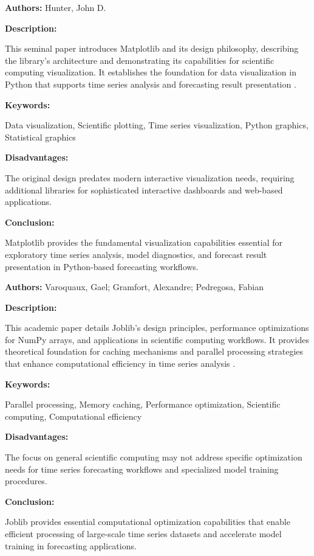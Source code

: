 
{ 
	
	\textbf{Authors:} Hunter, John D.
	
	\textbf{Description:} 
	
	This seminal paper introduces Matplotlib and its design philosophy, describing the library's architecture and demonstrating its capabilities for scientific computing visualization. It establishes the foundation for data visualization in Python that supports time series analysis and forecasting result presentation \autocite{Hunter:2007}.
	
	\textbf{Keywords:} 
	
	Data visualization, Scientific plotting, Time series visualization, Python graphics, Statistical graphics
	
	\textbf{Disadvantages:} 
	
	The original design predates modern interactive visualization needs, requiring additional libraries for sophisticated interactive dashboards and web-based applications.
	
	\textbf{Conclusion:} 
	
	Matplotlib provides the fundamental visualization capabilities essential for exploratory time series analysis, model diagnostics, and forecast result presentation in Python-based forecasting workflows.
	
}


{ 
	
	\textbf{Authors:} Varoquaux, Gael; Gramfort, Alexandre; Pedregosa, Fabian
	
	\textbf{Description:}
	
	This academic paper details Joblib's design principles, performance optimizations for NumPy arrays, and applications in scientific computing workflows. It provides theoretical foundation for caching mechanisms and parallel processing strategies that enhance computational efficiency in time series analysis \autocite{Varoquaux:2022}.
	
	\textbf{Keywords:}
	
	Parallel processing, Memory caching, Performance optimization, Scientific computing, Computational efficiency
	
	\textbf{Disadvantages:}
	
	The focus on general scientific computing may not address specific optimization needs for time series forecasting workflows and specialized model training procedures.
	
	\textbf{Conclusion:}
	
	Joblib provides essential computational optimization capabilities that enable efficient processing of large-scale time series datasets and accelerate model training in forecasting applications.
	
}

